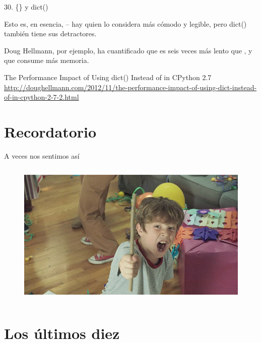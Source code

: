\documentclass[14pt]{beamer}
\begin{document}
\begin{frame}[fragile]{30. \{\} y dict()}
  \begin{alertblock}{}
    \centering
    Esto es, en esencia,  -- hay
    quien lo considera más cómodo y legible, pero dict() también tiene
    sus detractores.
  \end{alertblock}

  \vspace{0.5cm}

  \footnotesize
  \begin{center}
    \centering
    Doug Hellmann, por ejemplo, ha cuantificado que es seis veces más
    lento que {}, y que consume más memoria.
  \end{center}

  \footnotesize
    \begin{block}
    {\centering The Performance Impact of Using dict() Instead of {} in CPython 2.7}
    \centering
    \url{http://doughellmann.com/2012/11/the-performance-impact-of-using-dict-instead-of-in-cpython-2-7-2.html}
  \end{block}
\end{frame}

\section{Recordatorio}
\begin{frame}[fragile]{A veces nos sentimos así}
  \begin{figure}
    \centering
    \includegraphics[height=7cm]{pics/un-palo.jpg}
  \end{figure}
\end{frame}

\section{Los últimos diez}
\end{document}
